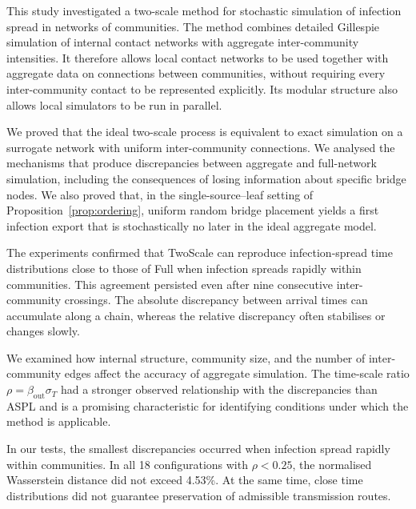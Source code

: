 \documentclass{ieeeaccess}
\newcommand{\michael}[2]{{\color{RoyalBlue}#1}}
\newcommand{\Full}{\textup{Full}}
\newcommand{\TS}{\textup{TwoScale}}
\begin{document}
This study investigated a two-scale method for stochastic simulation of infection spread in networks of communities. The method combines detailed Gillespie simulation of internal contact networks with aggregate inter-community intensities. It therefore allows local contact networks to be used together with aggregate data on connections between communities, without requiring every inter-community contact to be represented explicitly. Its modular structure also allows local simulators to be run in parallel.

We proved that the ideal two-scale process is equivalent to exact simulation on a surrogate network with uniform inter-community connections. We analysed the mechanisms that produce discrepancies between aggregate and full-network simulation, including the consequences of losing information about specific bridge nodes. \michael{We also proved that, in the single-source--leaf setting of Proposition~\ref{prop:ordering}, uniform random bridge placement yields a first infection export that is stochastically no later in the ideal aggregate model.}{We also proved that, when bridge nodes are placed uniformly at random, aggregation yields a first infection export that is stochastically no later in the ideal model.}

The experiments confirmed that \TS{} can reproduce infection-spread time distributions close to those of \Full{} when infection spreads rapidly within communities. This agreement persisted even after nine consecutive inter-community crossings. The absolute discrepancy between arrival times can accumulate along a chain, whereas the relative discrepancy often stabilises or changes slowly.

We examined how internal structure, community size, and the number of inter-community edges affect the accuracy of aggregate simulation. The time-scale ratio $\rho=\beta_{\mathrm{out}}\sigma_T$ had a stronger observed relationship with the discrepancies than ASPL and is a promising characteristic for identifying conditions under which the method is applicable.

In our tests, the smallest discrepancies occurred when infection spread rapidly within communities. In all 18 configurations with $\rho<0.25$, the normalised Wasserstein distance \michael{did not exceed 4.53\%}{did not exceed 4.5\%}. At the same time, close time distributions did not guarantee preservation of admissible transmission routes.

\appendices
\end{document}
